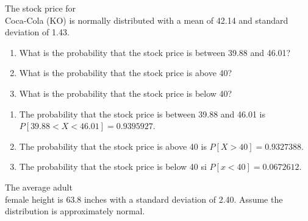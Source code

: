 \documentclass[11pt]{book}\usepackage[]{graphicx}\usepackage[]{color}
\begin{document}
\begin{exercises}
\begin{exercise}
	\end{exercise}
%
%
 
  \begin{exercise}	%

The stock price for \\ Coca-Cola (KO) is normally distributed with a mean of 42.14 and standard deviation of 1.43.

\begin{enumerate}
\item What is the probability that the stock price is between 39.88 and 46.01?
\item What is the probability that the stock price is above 40?
\item What is the probability that the stock price is below 40?
\end{enumerate}

  \end{exercise}
\begin{solution}  %


\begin{enumerate}
\item The probability that the stock price is between 39.88 and 46.01 is $P[39.88 < X < 46.01] = 0.9395927$.
\item The probability that the stock price is above 40 is $P[X > 40] = 0.9327388$.
\item The probability that the stock price is below 40 si $P[ x < 40] = 0.0672612$.
\end{enumerate}
\end{solution}

\begin{exercise}  %

The average adult \\ female  height is 63.8 inches with a standard deviation of 2.40. Assume the distribution is 
approximately normal.


\end{exercise}
\end{exercises}
\end{document}
